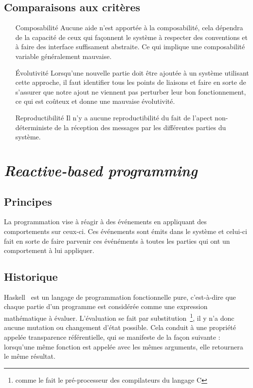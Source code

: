 \documentclass{article}
\begin{document}
\subsection{Comparaisons aux critères}
\begin{itemize}
    \item[Composabilité] Aucune aide n'est apportée à la composabilité, cela dépendra
de la capacité de ceux qui façonnent le système à respecter des conventions et à
faire des interface suffisament abstraite. Ce qui implique une composabilité variable
généralement mauvaise.
    \item[Évolutivité] Lorsqu'une nouvelle partie doit être ajoutée à un système
utilisant cette approche, il faut identifier tous les points de liaisons et faire
en sorte de s'assurer que notre ajout ne viennent pas perturber leur bon fonctionnement,
ce qui est coûteux et donne une mauvaise évolutivité.
    \item[Reproductibilité] Il n'y a aucune reproductibilité du fait de l'apect
non-déterministe de la réception des messages par les différentes parties du système.
\end{itemize}


\section{\emph{Reactive-based programming}}\label{reactive}

\subsection{Principes}\label{principes-1}

La programmation vise à réagir à des événements en appliquant des
comportements sur ceux-ci. Ces événements sont émits dans le système et celui-ci
fait en sorte de faire parvenir ces événéments à toutes les parties qui ont un comportement
à lui appliquer.

\subsection{Historique}\label{historique-1}

Haskell~\cite{haskell} est un langage de programmation fonctionnelle pure, c'est-à-dire
que chaque partie d'un programme est considérée comme une expression mathématique
à évaluer. L'évaluation se fait par substitution~\footnote{comme le fait le pré-processeur
des compilateurs du langage C}, il y n'a donc aucune mutation ou changement d'état
possible. Cela conduit à une propriété appelée transparence référentielle, qui se
manifeste de la façon suivante : lorsqu'une même fonction est appelée avec les mêmes
arguments, elle retournera le même résultat.
\end{document}
